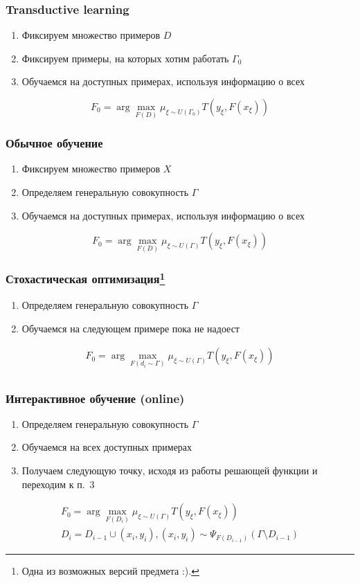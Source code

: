 \documentclass[14pt, fleqn, xcolor={dvipsnames, table}]{beamer}
\begin{document}
\begin{frame}
\frametitle{Transductive learning}
\begin{enumerate}
	\item Фиксируем множество примеров $D$
	\item Фиксируем примеры, на которых хотим работать $\Gamma_0$
	\item Обучаемся на доступных примерах, используя информацию о всех
\end{enumerate}
$$
F_0 = \arg \max_{F(D)} \mu_{\xi \sim U\left(\Gamma_0\right)}T(y_{\xi}, F(x_{\xi}))
$$
\end{frame}

\begin{frame}
\frametitle{Обычное обучение}
\begin{enumerate}
	\item Фиксируем множество примеров $X$
	\item Определяем генеральную совокупность $\Gamma$
	\item Обучаемся на доступных примерах, используя информацию о всех
\end{enumerate}
$$
F_0 = \arg \max_{F(D)} \mu_{\xi \sim U\left(\Gamma\right)}T(y_{\xi}, F(x_{\xi}))
$$
\end{frame}

\begin{frame}
\frametitle{Стохастическая оптимизация\footnote{Одна из возможных версий предмета :).}}
\begin{enumerate}
	\item Определяем генеральную совокупность $\Gamma$
	\item Обучаемся на следующем примере пока не надоест
\end{enumerate}
$$\begin{array}{l}
F_0 = \arg \max_{F(d_i \sim \Gamma)} \mu_{\xi \sim U\left(\Gamma\right)}T(y_{\xi}, F(x_{\xi})) \\
\end{array}$$
\end{frame}

\begin{frame}
\frametitle{Интерактивное обучение (online)}
\begin{enumerate}
	\item Определяем генеральную совокупность $\Gamma$
	\item Обучаемся на всех доступных примерах
	\item Получаем следующую точку, исходя из работы решающей функции и переходим к п.~3
\end{enumerate}
$$\begin{array}{l}
F_0 = \arg \max_{F(D_i)} \mu_{\xi \sim U\left(\Gamma\right)}T(y_{\xi}, F(x_{\xi})) \\
D_i = D_{i-1} \cup (x_i, y_i), (x_i, y_i) \sim \Psi_{F(D_{i-1})}\left(\Gamma \setminus D_{i-1}\right)
\end{array}$$
\end{frame}
\end{document}
